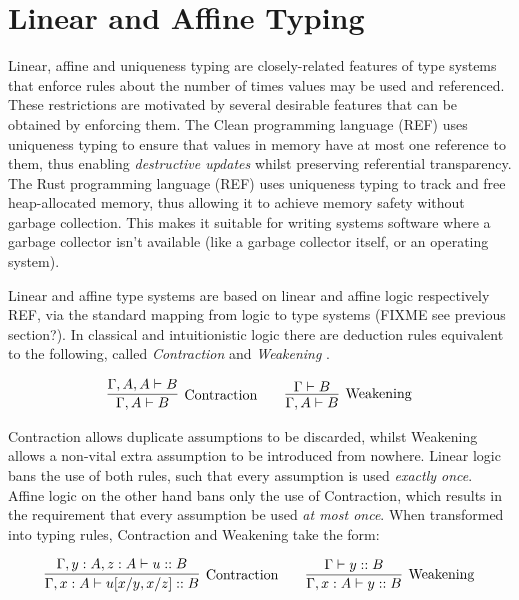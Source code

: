 \documentclass[]{unswthesis}
\begin{document}
\section{Linear and Affine Typing}

Linear, affine and uniqueness typing are closely-related features of type systems that enforce rules about the number of times values may be used and referenced. These restrictions are motivated by several desirable features that can be obtained by enforcing them. The Clean programming language (REF) uses uniqueness typing to ensure that values in memory have at most one reference to them, thus enabling \textit{destructive updates} whilst preserving referential transparency. The Rust programming language (REF) uses uniqueness typing to track and free heap-allocated memory, thus allowing it to achieve memory safety without garbage collection. This makes it suitable for writing systems software where a garbage collector isn't available (like a garbage collector itself, or an operating system).

Linear and affine type systems are based on linear and affine logic respectively \cite{girard87} REF, via the standard mapping from logic to type systems (FIXME see previous section?). In classical and intuitionistic logic there are deduction rules equivalent to the following, called \textit{Contraction} and \textit{Weakening} \cite{wadler90, wadler93}.

\begin{eqnarray*}
\infer[\text{Contraction}]{\Gamma, A \vdash B}{
	\Gamma, A, A \vdash B
}
\qquad
\infer[\text{Weakening}]{\Gamma, A \vdash B}{
    \Gamma \vdash B
}
\end{eqnarray*}

Contraction allows duplicate assumptions to be discarded, whilst Weakening allows a non-vital extra assumption to be introduced from nowhere. Linear logic bans the use of both rules, such that every assumption is used \textit{exactly once}. Affine logic on the other hand bans only the use of Contraction, which results in the requirement that every assumption be used \textit{at most once}. When transformed into typing rules, Contraction and Weakening take the form:

\begin{eqnarray*}
\infer[\text{Contraction}]{\Gamma, x : A \vdash u[x/y, x/z] :: B}{
	\Gamma, y : A, z : A \vdash u :: B
}
\qquad
\infer[\text{Weakening}]{\Gamma, x : A \vdash y :: B}{
    \Gamma\vdash y :: B
}
\end{eqnarray*}
\end{document}
